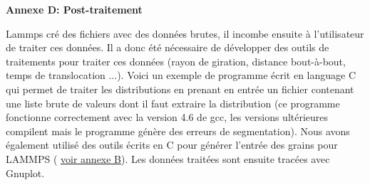 {}


\begin{figure}
\label{annexec}
\end{figure}




\newpage

{\Large\textbf{{Annexe D: Post-traitement}}}\\

{}

\begin{figure}
\label{annexed}
\end{figure}


Lammps cré des fichiers avec des données brutes, il incombe ensuite à l'utilisateur de traiter ces données. Il a donc été nécessaire de développer des outils de traitements pour traiter ces données (rayon de giration, distance bout-à-bout, temps de translocation ...). Voici un exemple de programme écrit en language C qui permet de traiter les distributions en prenant en entrée un fichier contenant une liste brute de valeurs dont il faut extraire la distribution (ce programme fonctionne correctement avec la version 4.6 de gcc, les versions ultérieures compilent mais le programme génère des erreurs de segmentation). Nous avons également utilisé des outils écrits en C pour générer l'entrée des grains pour LAMMPS ( \hyperref[annexeb]{voir annexe B}). Les données traitées sont ensuite tracées avec Gnuplot.




\newpage
\thispagestyle{empty}

